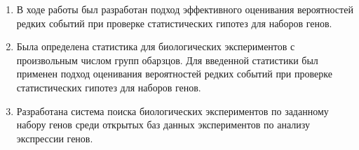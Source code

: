 \begin{enumerate}
  \item В ходе работы был разработан подход эффективного оценивания вероятностей редких событий при проверке статистических гипотез для наборов генов.
  \item Была определена статистика для биологических экспериментов с произвольным числом групп обарзцов. Для введенной статистики был применен подход оценивания вероятностей редких событий при проверке статистических гипотез для наборов генов.
  \item Разработана система поиска биологических экспериментов по заданному набору генов среди открытых баз данных экспериментов по анализу экспрессии генов.
\end{enumerate}
